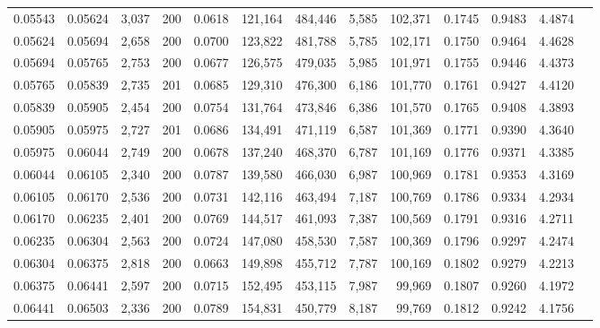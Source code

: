 \begin{tabular}{rrrrrrrrrrrrr}
0.05543 & 0.05624 & 3,037 & 200 &                                     0.0618 & 121,164 & 484,446 &   5,585 & 102,371 & 0.1745 & 0.9483 & 4.4874 \\
0.05624 & 0.05694 & 2,658 & 200 &                                     0.0700 & 123,822 & 481,788 &   5,785 & 102,171 & 0.1750 & 0.9464 & 4.4628 \\
0.05694 & 0.05765 & 2,753 & 200 &                                     0.0677 & 126,575 & 479,035 &   5,985 & 101,971 & 0.1755 & 0.9446 & 4.4373 \\
0.05765 & 0.05839 & 2,735 & 201 &                                     0.0685 & 129,310 & 476,300 &   6,186 & 101,770 & 0.1761 & 0.9427 & 4.4120 \\
0.05839 & 0.05905 & 2,454 & 200 &                                     0.0754 & 131,764 & 473,846 &   6,386 & 101,570 & 0.1765 & 0.9408 & 4.3893 \\
0.05905 & 0.05975 & 2,727 & 201 &                                     0.0686 & 134,491 & 471,119 &   6,587 & 101,369 & 0.1771 & 0.9390 & 4.3640 \\
0.05975 & 0.06044 & 2,749 & 200 &                                     0.0678 & 137,240 & 468,370 &   6,787 & 101,169 & 0.1776 & 0.9371 & 4.3385 \\
0.06044 & 0.06105 & 2,340 & 200 &                                     0.0787 & 139,580 & 466,030 &   6,987 & 100,969 & 0.1781 & 0.9353 & 4.3169 \\
0.06105 & 0.06170 & 2,536 & 200 &                                     0.0731 & 142,116 & 463,494 &   7,187 & 100,769 & 0.1786 & 0.9334 & 4.2934 \\
0.06170 & 0.06235 & 2,401 & 200 &                                     0.0769 & 144,517 & 461,093 &   7,387 & 100,569 & 0.1791 & 0.9316 & 4.2711 \\
0.06235 & 0.06304 & 2,563 & 200 &                                     0.0724 & 147,080 & 458,530 &   7,587 & 100,369 & 0.1796 & 0.9297 & 4.2474 \\
0.06304 & 0.06375 & 2,818 & 200 &                                     0.0663 & 149,898 & 455,712 &   7,787 & 100,169 & 0.1802 & 0.9279 & 4.2213 \\
0.06375 & 0.06441 & 2,597 & 200 &                                     0.0715 & 152,495 & 453,115 &   7,987 &  99,969 & 0.1807 & 0.9260 & 4.1972 \\
0.06441 & 0.06503 & 2,336 & 200 &                                     0.0789 & 154,831 & 450,779 &   8,187 &  99,769 & 0.1812 & 0.9242 & 4.1756 \\

\end{tabular}

